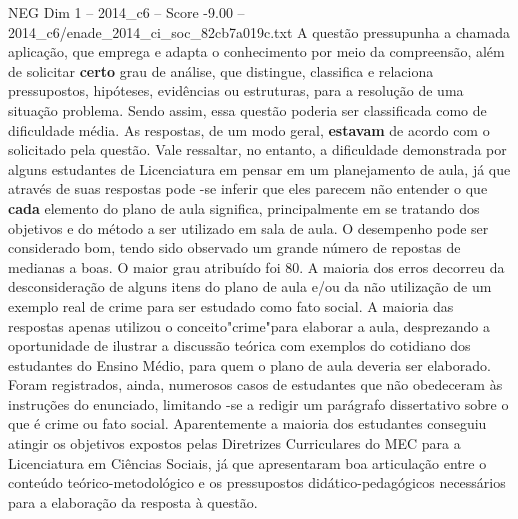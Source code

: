 \begin{textsample}{NEG Dim 1 – 2014\_c6 – Score -9.00 – 2014\_c6/enade\_2014\_ci\_soc\_82cb7a019c.txt}
A questão pressupunha a chamada aplicação, que emprega e adapta o conhecimento por meio da compreensão, além de solicitar \textbf{certo} grau de análise, que distingue, classifica e relaciona pressupostos, hipóteses, evidências ou estruturas, para a resolução de uma situação problema.
Sendo assim, essa questão poderia ser classificada como de dificuldade média.
As respostas, de um modo geral, \textbf{estavam} de acordo com o solicitado pela questão.
Vale ressaltar, no entanto, a dificuldade demonstrada por alguns estudantes de Licenciatura em pensar em um planejamento de aula, já que através de suas respostas pode -se inferir que eles parecem não entender o que \textbf{cada} elemento do plano de aula significa, principalmente em se tratando dos objetivos e do método a ser utilizado em sala de aula.
O desempenho pode ser considerado bom, tendo sido observado um grande número de repostas de medianas a boas.
O maior grau atribuído foi 80.
A maioria dos erros decorreu da desconsideração de alguns itens do plano de aula e/ou da não utilização de um exemplo real de crime para ser estudado como fato social.
A maioria das respostas apenas utilizou o conceito"crime"para elaborar a aula, desprezando a oportunidade de ilustrar a discussão teórica com exemplos do cotidiano dos estudantes do Ensino Médio, para quem o plano de aula deveria ser elaborado.
Foram registrados, ainda, numerosos casos de estudantes que não obedeceram às instruções do enunciado, limitando -se a redigir um parágrafo dissertativo sobre o que é crime ou fato social.
Aparentemente a maioria dos estudantes conseguiu atingir os objetivos expostos pelas Diretrizes Curriculares do MEC para a Licenciatura em Ciências Sociais, já que apresentaram boa articulação entre o conteúdo teórico-metodológico e os pressupostos didático-pedagógicos necessários para a elaboração da resposta à questão.

\end{textsample}
